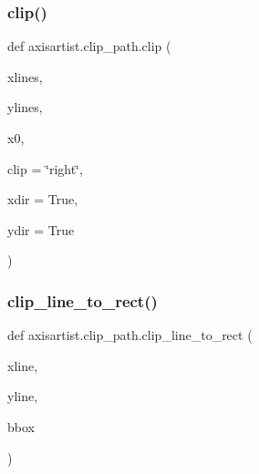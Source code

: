 \subsubsection{\texorpdfstring{clip()}{clip()}}
{\footnotesize\ttfamily def axisartist.\+clip\+\_\+path.\+clip (\begin{DoxyParamCaption}\item[{}]{xlines,  }\item[{}]{ylines,  }\item[{}]{x0,  }\item[{}]{clip = {\ttfamily \char`\"{}right\char`\"{}},  }\item[{}]{xdir = {\ttfamily True},  }\item[{}]{ydir = {\ttfamily True} }\end{DoxyParamCaption})}

\mbox{\label{namespaceaxisartist_1_1clip__path_a17888f7e35f00336d4682efc180df25b}} 
\subsubsection{\texorpdfstring{clip\+\_\+line\+\_\+to\+\_\+rect()}{clip\_line\_to\_rect()}}
{\footnotesize\ttfamily def axisartist.\+clip\+\_\+path.\+clip\+\_\+line\+\_\+to\+\_\+rect (\begin{DoxyParamCaption}\item[{}]{xline,  }\item[{}]{yline,  }\item[{}]{bbox }\end{DoxyParamCaption})}

